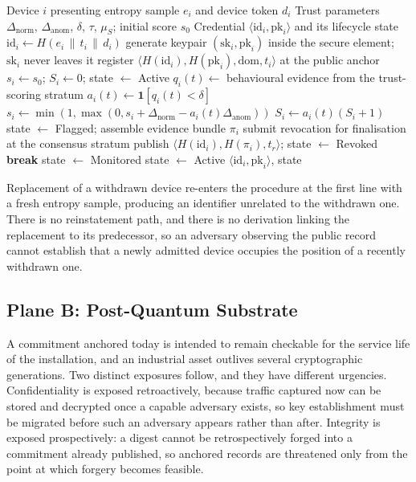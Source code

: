 \begin{algorithm}[t]
\caption{Credential issuance, additive trust updating, and withdrawal}
\label{alg:identity-lifecycle}
\begin{algorithmic}[1]
\Require Device $i$ presenting entropy sample $e_i$ and device token $d_i$
\Require Trust parameters $\Delta_{\mathrm{norm}}$, $\Delta_{\mathrm{anom}}$, $\delta$, $\tau$, $\mu_S$; initial score $s_0$
\Ensure Credential $\langle \mathrm{id}_i, \mathrm{pk}_i \rangle$ and its lifecycle state
\State $\mathrm{id}_i \gets H(e_i \,\|\, t_i \,\|\, d_i)$
\State generate keypair $(\mathrm{sk}_i, \mathrm{pk}_i)$ inside the secure element; $\mathrm{sk}_i$ never leaves it
\State register $\langle H(\mathrm{id}_i), H(\mathrm{pk}_i), \mathrm{dom}, t_i \rangle$ at the public anchor
\State $s_i \gets s_0$; \; $S_i \gets 0$; \; state $\gets$ Active
  \State $q_i(t) \gets$ behavioural evidence from the trust-scoring stratum
  \State $a_i(t) \gets \mathbf{1}[q_i(t)<\delta]$
  \State $s_i \gets \min(1,\max(0,s_i+\Delta_{\mathrm{norm}}-a_i(t)\Delta_{\mathrm{anom}}))$
  \State $S_i \gets a_i(t)(S_i+1)$ 
    \State state $\gets$ Flagged; assemble evidence bundle $\pi_i$
    \State submit revocation for finalisation at the consensus stratum
      \State publish $\langle H(\mathrm{id}_i), H(\pi_i), t_r \rangle$; \; state $\gets$ Revoked
      \State \textbf{break} 
    \EndIf
    \State state $\gets$ Monitored
  \Else
    \State state $\gets$ Active
  \EndIf
\EndFor
\State \Return $\langle \mathrm{id}_i, \mathrm{pk}_i \rangle$, state
\end{algorithmic}
\end{algorithm}

Replacement of a withdrawn device re-enters the procedure at the first line with a fresh entropy sample, producing an identifier unrelated to the withdrawn one. There is no reinstatement path, and there is no derivation linking the replacement to its predecessor, so an adversary observing the public record cannot establish that a newly admitted device occupies the position of a recently withdrawn one.

\subsection{Plane B: Post-Quantum Substrate}
\label{sec:plane-b}
A commitment anchored today is intended to remain checkable for the service life of the installation, and an industrial asset outlives several cryptographic generations. Two distinct exposures follow, and they have different urgencies. Confidentiality is exposed retroactively, because traffic captured now can be stored and decrypted once a capable adversary exists, so key establishment must be migrated before such an adversary appears rather than after. Integrity is exposed prospectively: a digest cannot be retrospectively forged into a commitment already published, so anchored records are threatened only from the point at which forgery becomes feasible.

